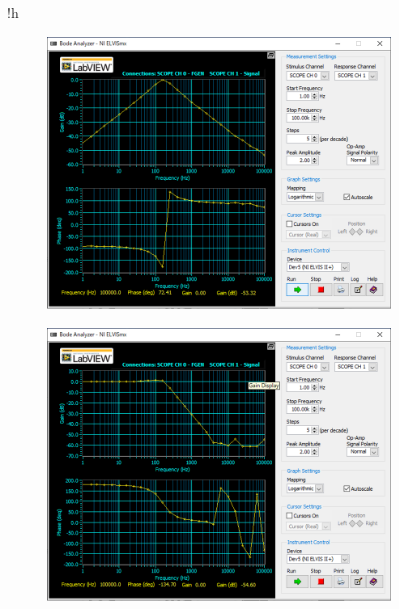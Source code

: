 \begin{figure}{!h}
	\centering
	\begin{subfigure}{0.8\linewidth}
		\centering
		\includegraphics[width=0.8\linewidth]{src/figures/exp10/10k-low-bode.png}
		\label{fig:exp10-10k-low-bode}
	\end{subfigure}
	\begin{subfigure}{0.8\linewidth}
		\centering
		\includegraphics[width=0.8\linewidth]{src/figures/exp10/10k-band-bode.png}
		\label{fig:exp10-10k-band-bode}
	\end{subfigure}
\end{figure}
